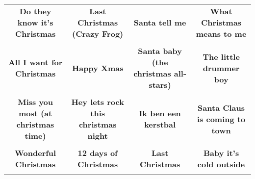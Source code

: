 \documentclass[12pt]{article} \usepackage{eso-pic, graphicx}
\newcommand{\background}[1]{%
\AddToShipoutPictureBG*{\texttt{[image: \#1]}}
}
\begin{document}
\tabcolsep=30.2pt \renewcommand{\arraystretch}{4.5}   \vspace*{4.3cm} \begin{center}  \begin{tabular}{c c c c}
\parbox{3cm}{\centering \textbf{Do they know it's Christmas}}& 
\parbox{3cm}{\centering \textbf{Last Christmas (Crazy Frog)}}& 
\parbox{3cm}{\centering \textbf{Santa tell me}}& 
\parbox{3cm}{\centering \textbf{What Christmas means to me}}\\ \\ 
\parbox{3cm}{\centering \textbf{All I want for Christmas}}& 
\parbox{3cm}{\centering \textbf{Happy Xmas}}& 
\parbox{3cm}{\centering \textbf{Santa baby (the christmas all-stars)}}& 
\parbox{3cm}{\centering \textbf{The little drummer boy}}\\ \\ 
\parbox{3cm}{\centering \textbf{Miss you most (at christmas time)}}& 
\parbox{3cm}{\centering \textbf{Hey lets rock this christmas night}}& 
\parbox{3cm}{\centering \textbf{Ik ben een kerstbal}}& 
\parbox{3cm}{\centering \textbf{Santa Claus is coming to town}}\\ \\ 
\parbox{3cm}{\centering \textbf{Wonderful Christmas}}& 
\parbox{3cm}{\centering \textbf{12 days of Christmas}}& 
\parbox{3cm}{\centering \textbf{Last Christmas}}& 
\parbox{3cm}{\centering \textbf{Baby it’s cold outside}}\\ \\ 
\end{tabular} \background{discobingo.pdf} \end{center} 
\end{document}
